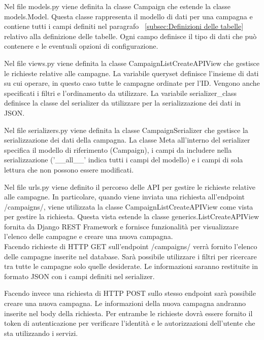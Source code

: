 

Nel file models.py viene definita la classe Campaign che estende la classe 
models.Model. Questa classe rappresenta il modello di dati per una campagna e 
contiene tutti i campi definiti nel paragrafo ~\ref{subsec:Definizioni delle tabelle} 
relativo alla definizione delle tabelle. 
Ogni campo definisce il tipo di dati che può contenere e le 
eventuali opzioni di configurazione. 

Nel file views.py viene definita la classe CampaignListCreateAPIView che 
gestisce le richieste relative alle campagne. La variabile queryset definisce 
l'insieme di dati su cui operare, in questo caso tutte le campagne ordinate per 
l'ID. Vengono anche specificati i  filtri e l’ordinamento da utilizzare. 
La variabile serializer\_class definisce la classe del serializer da utilizzare 
per la serializzazione dei dati in JSON.

Nel file serializers.py viene definita la classe CampaignSerializer che gestisce 
la serializzazione dei dati della campagna. La classe Meta all'interno del 
serializer specifica il modello di riferimento (Campaign), i campi da includere 
nella serializzazione ('\_\_all\_\_' indica tutti i campi del modello) e i campi di 
sola lettura che non possono essere modificati.

Nel file urls.py viene definito il percorso delle API per gestire le richieste 
relative alle campagne. In particolare, quando viene inviata una richiesta all'endpoint 
/campaigns/, viene utilizzata la classe CampaignListCreateAPIView come vista 
per gestire la richiesta. Questa vista estende la classe generics.ListCreateAPIView 
fornita da Django REST Framework e fornisce funzionalità per visualizzare 
l'elenco delle campagne e creare una nuova campagna.\\

Facendo richieste di HTTP GET sull’endpoint /campaigns/ verrà fornito l’elenco 
delle campagne inserite nel database. Sarà possibile utilizzare i filtri per 
ricercare tra tutte le campagne solo quelle desiderate. Le informazioni saranno 
restituite in formato JSON con i campi definiti nel serializer.

Facendo invece una richiesta di HTTP POST sullo stesso endpoint sarà possibile 
creare una nuova campagna. Le informazioni della nuova campagna andranno 
inserite nel body della richiesta.
Per entrambe le richieste dovrà essere fornito il token di autenticazione per 
verificare l’identità e le autorizzazioni dell’utente che sta utilizzando i 
servizi.


